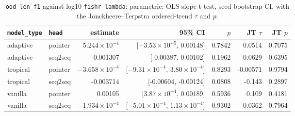 \documentclass[10pt]{article}
\begin{document}
{\small
\begin{longtable}{llrrrrr}
\caption{\texttt{ood\_len\_f1} against log10 \texttt{fishr\_lambda}: parametric: OLS slope t-test, seed-bootstrap CI, with the Jonckheere--Terpstra ordered-trend $\tau$ and $p$.}\label{tab:trend-ood_len_f1}\\
\toprule
\texttt{model\_type} & \texttt{head} & estimate & 95\% CI & $p$ & JT $\tau$ & JT $p$\\
\midrule
\endhead
adaptive & pointer & $5.244\times10^{-4}$ & [$-3.53\times10^{-5}$, 0.00148] & 0.7842 & 0.0514 & 0.7075\\
adaptive & seq2seq & -0.001307 & [-0.00387, 0.00102] & 0.1962 & -0.0629 & 0.6395\\
tropical & pointer & $-3.658\times10^{-4}$ & [$-9.31\times10^{-4}$, $3.80\times10^{-4}$] & 0.8293 & -0.00571 & 0.9794\\
tropical & seq2seq & -0.003714 & [-0.00604, -0.00124] & 0.0808 & -0.143 & 0.2897\\
vanilla & pointer & 0.00105 & [$3.87\times10^{-4}$, 0.00189] & 0.5936 & 0.109 & 0.4181\\
vanilla & seq2seq & $-1.934\times10^{-4}$ & [$-5.01\times10^{-4}$, $1.13\times10^{-4}$] & 0.9302 & 0.0362 & 0.7964\\
\bottomrule
\end{longtable}
}
\end{document}
